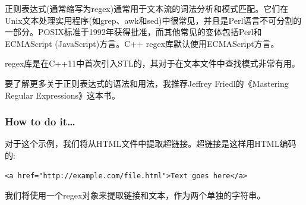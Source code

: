 
正则表达式(通常缩写为regex)通常用于文本流的词法分析和模式匹配。它们在Unix文本处理实用程序(如grep、awk和sed)中很常见，并且是Perl语言不可分割的一部分。POSIX标准于1992年获得批准，而其他常见的变体包括Perl和ECMAScript (JavaScript)方言。C++ regex库默认使用ECMAScript方言。

regex库是在C++11中首次引入STL的，其对于在文本文件中查找模式非常有用。

要了解更多关于正则表达式的语法和用法，我推荐Jeffrey Friedl的《Mastering Regular Expressions》这本书。

\subsubsection{How to do it…}

对于这个示例，我们将从HTML文件中提取超链接。超链接是这样用HTML编码的:

\begin{lstlisting}[style=styleCXX]
<a href="http://example.com/file.html">Text goes here</a>
\end{lstlisting}

我们将使用一个regex对象来提取链接和文本，作为两个单独的字符串。


